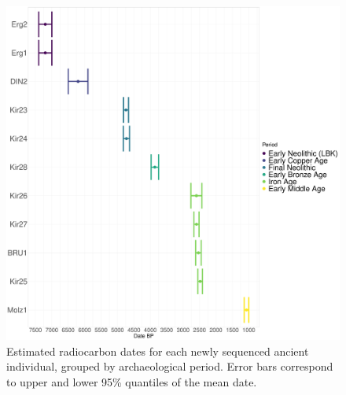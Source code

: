 \begin{figure}[htp]
    \centering
    \includegraphics[width=1.0\textwidth]{../images/chapter4/Dates.pdf}
    \caption{Estimated radiocarbon dates for each newly sequenced ancient individual, grouped by archaeological period. Error bars correspond to upper and lower 95\% quantiles of the mean date.}
    \label{fig:chapter4_intro_SamplesDates}
\end{figure}

